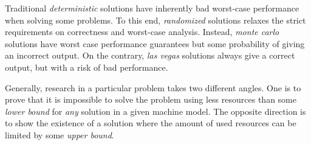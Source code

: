 
Traditional \emph{deterministic} solutions have inherently bad worst-case performance when solving some problems. To this end, \emph{randomized} solutions relaxes the strict requirements on correctness and worst-case analysis. Instead, \emph{monte carlo} solutions have worst case performance guarantees but some probability of giving an incorrect output. On the contrary, \emph{las vegas} solutions always give a correct output, but with a risk of bad performance.

Generally, research in a particular problem takes two different angles. 
One is to prove that it is impossible to solve the problem using less resources than some \emph{lower bound} for \emph{any} solution in a given machine model. The opposite direction is to show the existence of a solution where the amount of used resources can be limited by some \emph{upper bound}. 

